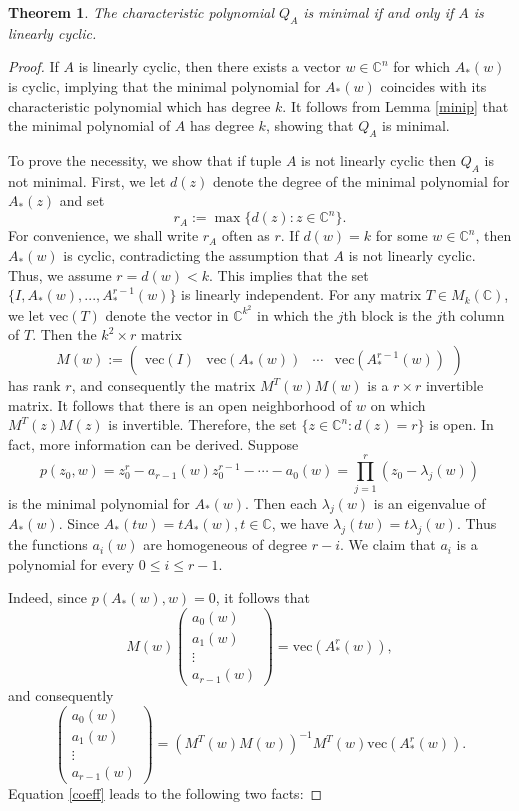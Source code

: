 \documentclass[draft, 12pt, reqno]{amsart}
\newcommand{\C}{{\mathbb C}}
\numberwithin{equation}{section}
\theoremstyle{plain}
\newtheorem{theorem}{Theorem}[section]
\begin{document}
\begin{theorem}\label{lcyclic}
The characteristic polynomial $Q_A$ is minimal if and only if $A$ is linearly cyclic.
\end{theorem}
\begin{proof}
If $A$ is linearly cyclic, then there exists a vector $w\in \C^n$ for which $A_*(w)$ is cyclic, implying that the minimal polynomial for $A_*(w)$ coincides with its characteristic polynomial which has degree $k$. It follows from Lemma \ref{minip} that the minimal polynomial of $A$ has degree $k$, showing that $Q_A$ is minimal.

To prove the necessity, we show that if tuple $A$ is not linearly cyclic then $Q_A$ is not minimal.
First, we let $d(z)$ denote the degree of the minimal polynomial for $A_*(z)$ and set \[r_A:=\max \{d(z): z\in \C^n\}.\] For convenience, we shall write $r_A$ often as $r$. If $d(w)=k$ for some $w\in \C^n$, then $A_*(w)$ is cyclic, contradicting the assumption that $A$ is not linearly cyclic. Thus, we assume $r=d(w)<k$. This implies that the set $\{I, A_*(w), ..., A^{r-1}_*(w)\}$ is linearly independent. For any matrix $T\in M_k(\C)$, we let vec$(T)$ denote the vector in $\C^{k^2}$ in which the $j$th block is the $j$th column of $T$. Then the $k^2\times r$ matrix 
\[M(w):=\begin{pmatrix} \text{vec}(I) & \text{vec}(A_*(w)) & \cdots & \text{vec}(A^{r-1}_*(w))\end{pmatrix}\] has rank $r$, and consequently the matrix $M^T(w)M(w)$ is a $r\times r$ invertible matrix. It follows that there is an open neighborhood of $w$ on which $M^T(z)M(z)$ is invertible. Therefore, the set $\{z\in \C^n: d(z)=r\}$ is open. In fact, more information can be derived. Suppose 
\[p(z_0,w)=z_0^r-a_{r-1}(w)z_0^{r-1}-\cdots -a_0(w)=\prod_{j=1}^r(z_0-\lambda_j(w))\] is the minimal polynomial for $A_*(w)$. Then each $\lambda_j(w)$ is an eigenvalue of $A_*(w)$. Since $A_*(tw)=tA_*(w), t\in \C$, we have $\lambda_j(tw)=t\lambda_j(w)$. Thus the functions $a_i(w)$ are homogeneous of degree $r-i$. We claim that $a_i$ is a polynomial for every $0\leq i\leq r-1$. 

Indeed, since $p(A_*(w),w)=0$, it follows that
\[M(w)\begin{pmatrix} a_0(w)\\ a_1(w) \\ \vdots \\a_{r-1}(w)\end{pmatrix}=\text{vec}(A^{r}_*(w)),\] and consequently
\begin{equation}\label{coeff}
\begin{pmatrix} a_0(w)\\ a_1(w) \\ \vdots \\a_{r-1}(w)\end{pmatrix}=\left(M^T(w)M(w)\right)^{-1}M^T(w)\text{vec}(A^r_*(w)).
\end{equation}
Equation \eqref{coeff} leads to the following two facts:


\end{proof}
\end{document}
